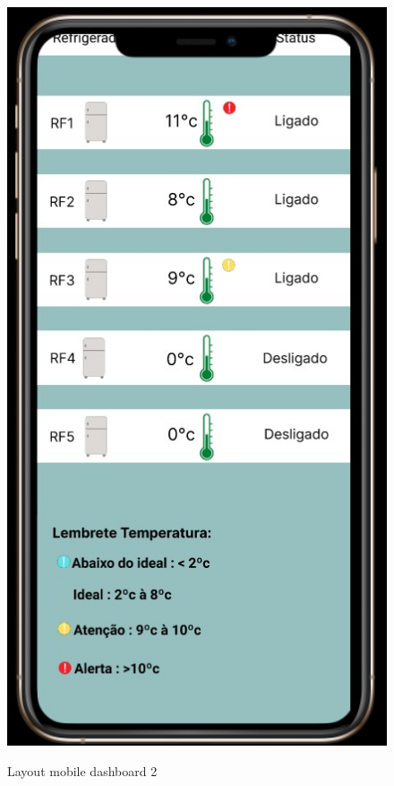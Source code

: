 \documentclass[hidelinks, 12pt, a4paper, brazil, oneside]{abntex2}
\begin{document}
    \begin{figure}[ht]
        \caption{Layout mobile dashboard 2}
        \centering
        \includegraphics[scale=0.5]{img/mobile/dashboard_2.jpeg}
        \label{fig:mobileDashboard2}
    \end{figure}
\end{document}
